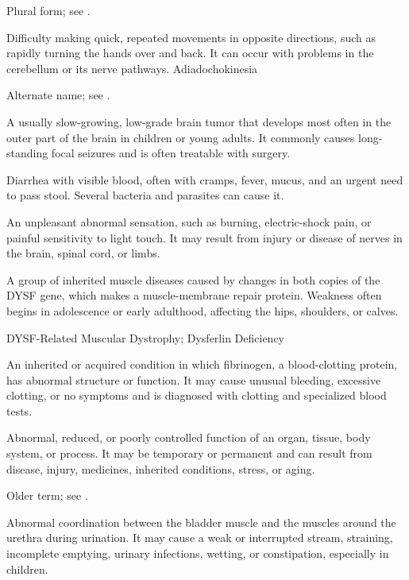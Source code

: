  Plural form; see .

 Difficulty making quick, repeated movements in opposite directions, such as rapidly turning the hands over and back. It can occur with problems in the cerebellum or its nerve pathways.
\synonyms
Adiadochokinesia

 Alternate name; see .


 A usually slow-growing, low-grade brain tumor that develops most often in the outer part of the brain in children or young adults. It commonly causes long-standing focal seizures and is often treatable with surgery.

 Diarrhea with visible blood, often with cramps, fever, mucus, and an urgent need to pass stool. Several bacteria and parasites can cause it.

 An unpleasant abnormal sensation, such as burning, electric-shock pain, or painful sensitivity to light touch. It may result from injury or disease of nerves in the brain, spinal cord, or limbs.

 A group of inherited muscle diseases caused by changes in both copies of the DYSF gene, which makes a muscle-membrane repair protein. Weakness often begins in adolescence or early adulthood, affecting the hips, shoulders, or calves.

\synonyms
DYSF-Related Muscular Dystrophy; Dysferlin Deficiency

 An inherited or acquired condition in which fibrinogen, a blood-clotting protein, has abnormal structure or function. It may cause unusual bleeding, excessive clotting, or no symptoms and is diagnosed with clotting and specialized blood tests.

 Abnormal, reduced, or poorly controlled function of an organ, tissue, body system, or process. It may be temporary or permanent and can result from disease, injury, medicines, inherited conditions, stress, or aging.

 Older term; see .

 Abnormal coordination between the bladder muscle and the muscles around the urethra during urination. It may cause a weak or interrupted stream, straining, incomplete emptying, urinary infections, wetting, or constipation, especially in children.

